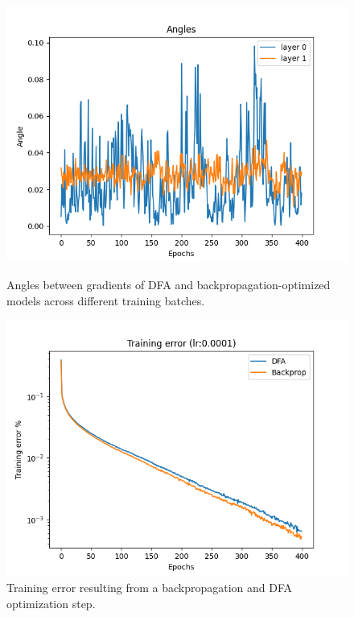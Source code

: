\documentclass[english]{article}
\begin{document}
\begin{figure}[!h]
    \centering
    \begin{minipage}{0.48\textwidth}
        \includegraphics[width=\textwidth]{rsc/angles/DFA_BACK_angles.png}
        \caption{Angles between gradients of DFA and backpropagation-optimized models across different training batches.}\label{fig:angles-dfa-back}
    \end{minipage}%
    \hfill
    \begin{minipage}{0.48\textwidth}
        \includegraphics[width=\textwidth]{rsc/angles/DFA_BACK_angles_TE.png}
        \caption{Training error resulting from a backpropagation and DFA optimization step.}\label{fig:angles-dfa-back-te}
    \end{minipage}%
\end{figure}
\end{document}
